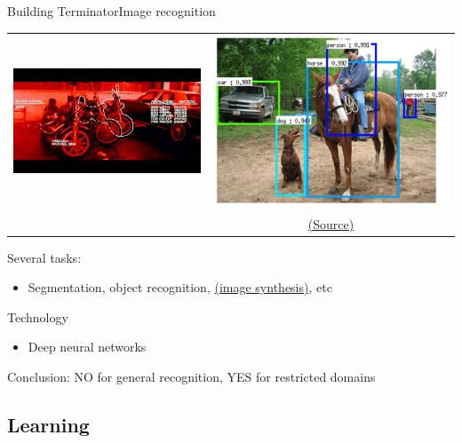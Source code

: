 \documentclass[10pt,compress]{beamer} %
\begin{document}
\begin{frame}{Building Terminator}{Image recognition}
    \begin{table}
	\begin{tabular}{cc}
		\includegraphics[width=0.5\linewidth]{figs/segmentation.jpeg} & \includegraphics[width=0.4\linewidth]{figs/detection.png} \\ 
  	    & \tiny \href{https://joshua19881228.github.io/2017-06-13-An-Introduction-to-CNN-based-Object-Detection/}{(Source)}     \\ 
	\end{tabular}
    \end{table}
    
    \vspace{-0.5cm}

    \normalsize{
    Several tasks:
    \begin{itemize}
        \item Segmentation, object recognition, \href{https://thispersondoesnotexist.com/}{(image synthesis)}, etc
    \end{itemize}
    Technology
    \begin{itemize}
        \item Deep neural networks
    \end{itemize}
	Conclusion: NO for general recognition, YES for restricted domains
    }
\end{frame}

\subsection{Learning}
\end{document}
